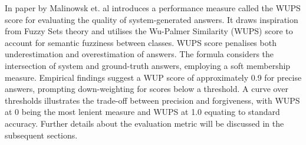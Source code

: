In paper by Malinowsk et. al \cite{malinowski2014multi} introduces a performance measure called the WUPS score for evaluating the quality of system-generated answers. It draws inspiration from Fuzzy Sets theory and utilises the Wu-Palmer Similarity (WUPS) score to account for semantic fuzziness between classes. WUPS score penalises both underestimation and overestimation of answers. The formula considers the intersection of system and ground-truth answers, employing a soft membership measure. Empirical findings suggest a WUP score of approximately 0.9 for precise answers, prompting down-weighting for scores below a threshold. A curve over thresholds illustrates the trade-off between precision and forgiveness, with WUPS at 0 being the most lenient measure and WUPS at 1.0 equating to standard accuracy. Further details about the evaluation metric will be discussed in the subsequent sections. 






